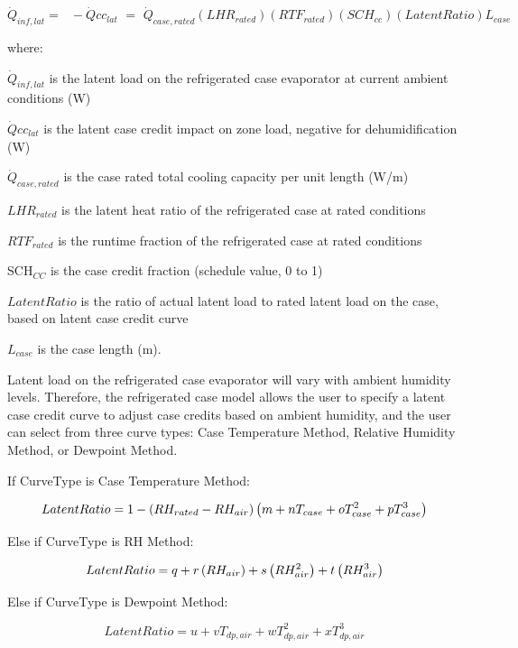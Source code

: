 \begin{equation}
{\dot Q_{inf,lat}} = \,\,\,\, - \dot Qc{c_{lat}}\,\, = \,\,{\dot Q_{case,rated}}\left( {LH{R_{rated}}} \right)\left( {RT{F_{rated}}} \right)\left( {SC{H_{cc}}} \right)\left( {LatentRatio} \right){L_{case}}
\end{equation}

where:

\({\dot Q_{inf,lat}}\) is the latent load on the refrigerated case evaporator at current ambient conditions (W)

\(\dot Qc{c_{lat}}\) is the latent case credit impact on zone load, negative for dehumidification (W)

\({\dot Q_{case,rated}}\) is the case rated total cooling capacity per unit length (W/m)

\(LH{R_{rated}}\) is the latent heat ratio of the refrigerated case at rated conditions

\(RT{F_{rated}}\) is the runtime fraction of the refrigerated case at rated conditions

SCH\(_{CC}\) is the case credit fraction (schedule value, 0 to 1)

\(LatentRatio\) is the ratio of actual latent load to rated latent load on the case, based on latent case credit curve

\({L_{case}}\) is the case length (m).

Latent load on the refrigerated case evaporator will vary with ambient humidity levels. Therefore, the refrigerated case model allows the user to specify a latent case credit curve to adjust case credits based on ambient humidity, and the user can select from three curve types: Case Temperature Method, Relative Humidity Method, or Dewpoint Method.

If CurveType is Case Temperature Method:

\begin{equation}
  LatentRatio = 1-\left(RH_{rated}-RH_{air}\right)\left(m+nT_{case}+oT_{case}^2+pT_{case}^3\right)
\end{equation}

Else if CurveType is RH Method:

\begin{equation}
  LatentRatio = q + r\left(RH_{air}\right) + s\left(RH_{air}^2\right) + t\left(RH_{air}^3\right)
\end{equation}

Else if CurveType is Dewpoint Method:

\begin{equation}
  LatentRatio = u + vT_{dp,air} + wT_{dp,air}^2 + xT_{dp,air}^3
\end{equation}

